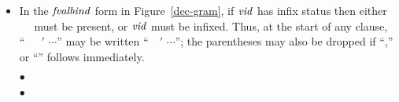 \begin{itemize}
  \item
    In the ${\it fvalbind}$ form in Figure~\ref{dec-gram}, if ${\it vid}$ has infix status then either
    ~\OP~ must be present, or ${\it vid}$ must be infixed.  Thus, at the start of
    any clause, ``~\OP\ \vid\ \ml{(}\atpat\ml{,}\atpat$'$\ml{)} $\cdots$'' may be
    written
    ``\ml{(}\atpat\ \vid\ \atpat$'$\ml{)} $\cdots$''; the parentheses may also be
    dropped if  ``\ml{:}\ty,'' or ``\ml{=}'' follows immediately.
  \item[\textcolor{\fixcolor}{$\bullet$}]
  \item[\textcolor{\addcolor}{$\bullet$}]
\end{itemize}%

